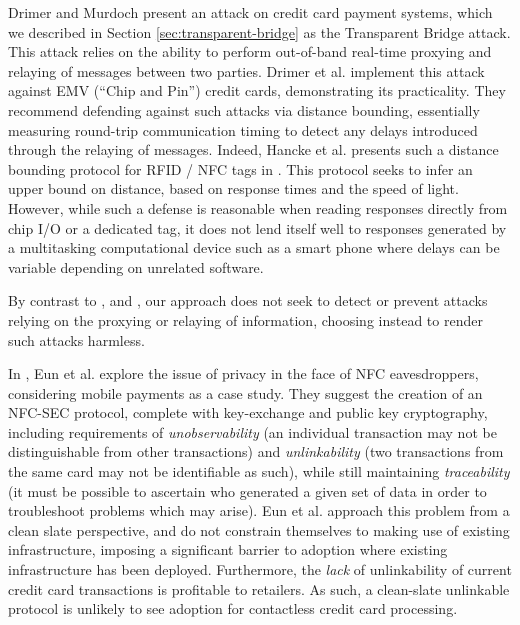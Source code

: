 Drimer and Murdoch \cite{Drimer:2007:KYE:1362903.1362910} present an attack on credit card payment systems,
    which we described in Section \ref{sec:transparent-bridge} as the Transparent Bridge attack.
This attack relies on the ability to perform out-of-band real-time proxying and relaying of messages between two parties.
Drimer et al. implement this attack against EMV (``Chip and Pin'') credit cards, demonstrating its practicality.
They recommend defending against such attacks via distance bounding,
    essentially measuring round-trip communication timing to detect any delays introduced through the relaying of messages.
Indeed, Hancke et al. presents such a distance bounding protocol for RFID / NFC tags in \cite{hancke2005rfid}.
    This protocol seeks to infer an upper bound on distance, based on response times and the speed of light.
However, while such a defense is reasonable when reading responses directly from chip I/O or a dedicated tag,
    it does not lend itself well to responses generated by a multitasking computational device such as a smart phone where delays can be variable depending on unrelated software.

By contrast to \cite{francis2010practical}, \cite{markantonakis2012practical} and \cite{Drimer:2007:KYE:1362903.1362910},
    our approach does not seek to detect or prevent attacks relying on the proxying or relaying of information, choosing instead to render such attacks harmless.

In \cite{eun2013conditional}, Eun et al. explore the issue of privacy in the face of NFC eavesdroppers, considering mobile payments as a case study.
They suggest the creation of an NFC-SEC protocol, complete with key-exchange and public key cryptography, including requirements of
    \emph{unobservability} (an individual transaction may not be distinguishable from other transactions) and
    \emph{unlinkability} (two transactions from the same card may not be identifiable as such), while still maintaining
    \emph{traceability} (it must be possible to ascertain who generated a given set of data in order to troubleshoot problems which may arise).
Eun et al. approach this problem from a clean slate perspective, and do not constrain themselves to making use of existing infrastructure,
    imposing a significant barrier to adoption where existing infrastructure has been deployed.
Furthermore, the \emph{lack} of unlinkability of current credit card transactions is profitable to retailers.
As such, a clean-slate unlinkable protocol is unlikely to see adoption for contactless credit card processing.

